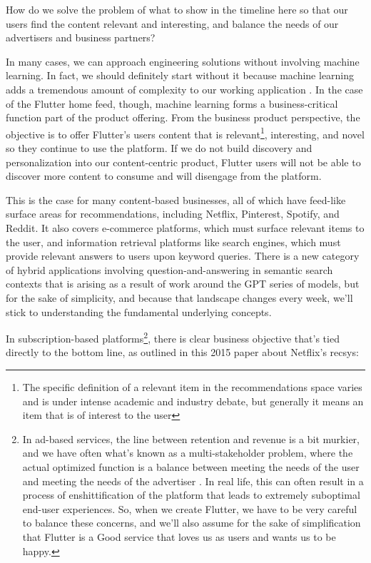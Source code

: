 \documentclass[11pt, table]{diazessay} %
\begin{document}
\begin{sloppypar}
How do we solve the problem of what to show in the timeline here so that our users find the content relevant and interesting, and balance the needs of our advertisers and business partners?

In many cases, we can approach engineering solutions without involving machine learning. In fact, we should definitely start without it \citep{zinkevich2017rules} because machine learning adds a tremendous amount of complexity to our working application \citep{sculley2014machine}. In the case of the Flutter home feed, though, machine learning forms a business-critical function part of the product offering. From the business product perspective, the objective is to offer Flutter’s users content that is relevant\footnote{The specific definition of a relevant item in the recommendations space varies and is under intense academic and industry debate, but generally it means an item that is of interest to the user}, interesting, and novel so they continue to use the platform.  If we do not build discovery and personalization into our content-centric product, Flutter users will not be able to discover more content to consume and will disengage from the platform.

This is the case for many content-based businesses, all of which have feed-like surface areas for recommendations, including Netflix, Pinterest, Spotify, and Reddit.  It also covers e-commerce platforms, which must surface relevant items to the user, and information retrieval platforms like search engines, which must provide relevant answers to users upon keyword queries. There is a new category of hybrid applications involving question-and-answering in semantic search contexts that is arising as a result of work around the GPT series of models, but for the sake of simplicity, and because that landscape changes every week, we'll stick to understanding the fundamental underlying concepts.

In subscription-based platforms\footnote{In ad-based services, the line between retention and revenue is a bit murkier, and we have often what's known as a multi-stakeholder problem, where the actual optimized function is a balance between meeting the needs of the user and meeting the needs of the advertiser \citep{zheng2017multi}.  In real life, this can often result in a process of enshittification \citep{doctorow_2023} of the platform that leads to extremely suboptimal end-user experiences. So, when we create Flutter, we have to be very careful to balance these concerns, and we'll also assume for the sake of simplification that Flutter is a Good service that loves us as users and wants us to be happy.}, there is clear business objective that's tied directly to the bottom line, as outlined in this 2015 paper  \citep{steck2021deep}  about Netflix's recsys:


\end{sloppypar}
\end{document}
